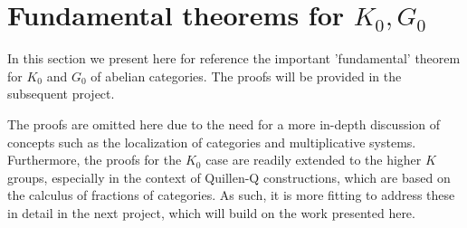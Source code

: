 \documentclass[12pt]{report}
\numberwithin{equation}{section}
\begin{document}
	\section{Fundamental theorems for $K_0,G_0$}
	In this section we present here for reference the important 'fundamental' theorem for $K_0$ and $G_0$ of abelian categories. The proofs will be provided in the subsequent project. 
	
	The proofs are omitted here due to the need for a more in-depth discussion of concepts such as the localization of categories and multiplicative systems. Furthermore, the proofs for the $K_0$ case are readily extended to the higher $K$ groups, especially in the context of Quillen-Q constructions, which are based on the calculus of fractions of categories. As such, it is more fitting to address these in detail in the next project, which will build on the work presented here.
	
\end{document}
